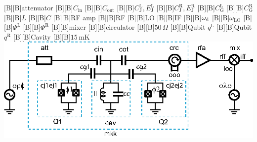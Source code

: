 

\figstyle
 [B][B]{attenuator}
 [B][B]{${C_\text{in}}$}
 [B][B]{${C_\text{out}}$}
 [B][B]{${C_{\text{J}}^{\text{L}},E_{\text{J}}^{\text{L}}}$}
 [B][B]{${C_{\text{J}}^{\text{R}},E_{\text{J}}^{\text{R}}}$}
 [B][B]{${C_{\text{G}}^{\text{L}}}$}
 [B][B]{${C_{\text{G}}^{\text{R}}}$}
 [B][B]{${L}$}
 [B][B]{${C}$}
 [B][B]{RF amp}
 [B][B]{RF}
 [B][B]{LO}
 [B][B]{IF}
 [B][B]{${\omega_{\text{d}}}$}
 [B][B]{${\omega_\text{LO}}$}
 [B][B]{${\Phi^{\text{L}}}$}
 [B][B]{${\Phi^{\text{R}}}$}
 [B][B]{mixer}
 [B][B]{circulator}
 [B][B]{${50\,\Omega}$}
 [B][B]{Qubit $q^\text{L}$}
 [B][B]{Qubit $q^\text{R}$}
 [B][B]{Cavity}
 [B][B]{${15\,\text{mK}}$}
\includegraphics[width=\textwidth-3pt]{expschematic.eps}

